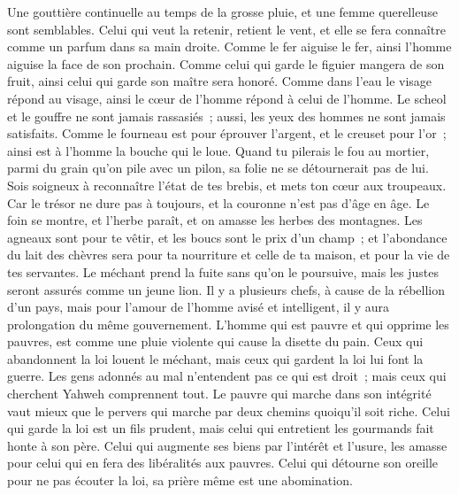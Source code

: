 \begin{multicols}{2}
Une gouttière continuelle au temps de la grosse pluie, et une femme querelleuse sont semblables.
Celui qui veut la retenir, retient le vent, et elle se fera connaître comme un parfum dans sa main droite.
Comme le fer aiguise le fer, ainsi l'homme aiguise la face de son prochain.
Comme celui qui garde le figuier mangera de son fruit, ainsi celui qui garde son maître sera honoré.
Comme dans l'eau le visage répond au visage, ainsi le cœur de l'homme répond à celui de l'homme.
Le scheol et le gouffre ne sont jamais rassasiés~; aussi, les yeux des hommes ne sont jamais satisfaits.
Comme le fourneau est pour éprouver l'argent, et le creuset pour l'or~; ainsi est à l'homme la bouche qui le loue.
Quand tu pilerais le fou au mortier, parmi du grain qu'on pile avec un pilon, sa folie ne se détournerait pas de lui.
Sois soigneux à reconnaître l'état de tes brebis, et mets ton cœur aux troupeaux.
Car le trésor ne dure pas à toujours, et la couronne n'est pas d'âge en âge.
Le foin se montre, et l'herbe paraît, et on amasse les herbes des montagnes.
Les agneaux sont pour te vêtir, et les boucs sont le prix d'un champ~;
et l'abondance du lait des chèvres sera pour ta nourriture et celle de ta maison, et pour la vie de tes servantes.
\VerseOne{}Le méchant prend la fuite sans qu'on le poursuive, mais les justes seront assurés comme un jeune lion.
Il y a plusieurs chefs, à cause de la rébellion d'un pays, mais pour l'amour de l'homme avisé et intelligent, il y aura prolongation du même gouvernement.
L'homme qui est pauvre et qui opprime les pauvres, est comme une pluie violente qui cause la disette du pain.
Ceux qui abandonnent la loi louent le méchant, mais ceux qui gardent la loi lui font la guerre.
Les gens adonnés au mal n'entendent pas ce qui est droit~; mais ceux qui cherchent Yahweh comprennent tout.
Le pauvre qui marche dans son intégrité vaut mieux que le pervers qui marche par deux chemins quoiqu'il soit riche.
Celui qui garde la loi est un fils prudent, mais celui qui entretient les gourmands fait honte à son père.
Celui qui augmente ses biens par l'intérêt et l'usure, les amasse pour celui qui en fera des libéralités aux pauvres.
Celui qui détourne son oreille pour ne pas écouter la loi, sa prière même est une abomination.

\end{multicols}
